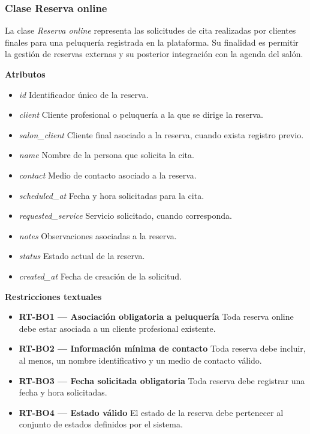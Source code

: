 \subsubsection{Clase Reserva online}

La clase \textit{Reserva online} representa las solicitudes de cita realizadas por clientes finales para una peluquería registrada en la plataforma. Su finalidad es permitir la gestión de reservas externas y su posterior integración con la agenda del salón.

\textbf{Atributos}

\begin{itemize}

      \item \textit{id}
            Identificador único de la reserva.
      \item \textit{client}
            Cliente profesional o peluquería a la que se dirige la reserva.
      \item \textit{salon\_client}
            Cliente final asociado a la reserva, cuando exista registro previo.
      \item \textit{name}
            Nombre de la persona que solicita la cita.
      \item \textit{contact}
            Medio de contacto asociado a la reserva.
      \item \textit{scheduled\_at}
            Fecha y hora solicitadas para la cita.
      \item \textit{requested\_service}
            Servicio solicitado, cuando corresponda.
      \item \textit{notes}
            Observaciones asociadas a la reserva.
      \item \textit{status}
            Estado actual de la reserva.
      \item \textit{created\_at}
            Fecha de creación de la solicitud.

\end{itemize}

\textbf{Restricciones textuales}

\begin{itemize}

      \item \textbf{RT-BO1 — Asociación obligatoria a peluquería}
            Toda reserva online debe estar asociada a un cliente profesional existente.
      \item \textbf{RT-BO2 — Información mínima de contacto}
            Toda reserva debe incluir, al menos, un nombre identificativo y un medio de contacto válido.
      \item \textbf{RT-BO3 — Fecha solicitada obligatoria}
            Toda reserva debe registrar una fecha y hora solicitadas.
      \item \textbf{RT-BO4 — Estado válido}
            El estado de la reserva debe pertenecer al conjunto de estados definidos por el sistema.

\end{itemize}